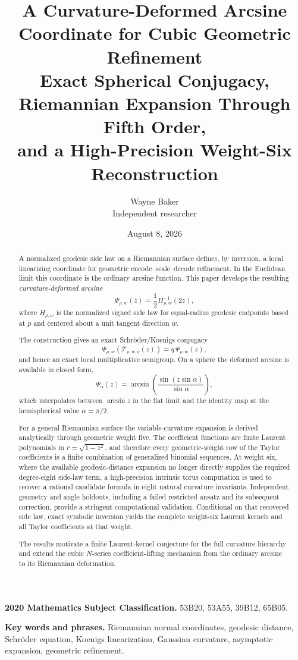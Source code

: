 \documentclass[11pt]{article}
\title{\textbf{A Curvature-Deformed Arcsine Coordinate for Cubic Geometric Refinement}\\[0.5em]
\large Exact Spherical Conjugacy, Riemannian Expansion Through Fifth Order,\\
and a High-Precision Weight-Six Reconstruction}
\author{Wayne Baker\\Independent researcher}
\date{August 8, 2026}
\theoremstyle{definition}
\theoremstyle{remark}
\newcommand{\cT}{\mathcal{T}}
\begin{document}
\maketitle

\begin{abstract}
A normalized geodesic side law on a Riemannian surface defines, by inversion, a
local linearizing coordinate for geometric encode--scale--decode refinement.
In the Euclidean limit this coordinate is the ordinary arcsine function.
This paper develops the resulting \emph{curvature-deformed arcsine}
\[
\Psi_{\rho,w}(z)=\frac12 H_{\rho,w}^{-1}(2z),
\]
where \(H_{\rho,w}\) is the normalized signed side law for equal-radius geodesic
endpoints based at \(p\) and centered about a unit tangent direction \(w\).

The construction gives an exact Schr\"oder/Koenigs conjugacy
\[
\Psi_{\rho,w}\!\left(\cT_{\rho,w,q}(z)\right)
=q\,\Psi_{\rho,w}(z),
\]
and hence an exact local multiplicative semigroup.  On a sphere the deformed
arcsine is available in closed form,
\[
\Psi_\alpha(z)
=
\arcsin\!\left(
\frac{\sin(z\sin\alpha)}{\sin\alpha}
\right),
\]
which interpolates between \(\arcsin z\) in the flat limit and the identity
map at the hemispherical value \(\alpha=\pi/2\).

For a general Riemannian surface the variable-curvature expansion is derived
analytically through geometric weight five.  The coefficient functions are
finite Laurent polynomials in \(r=\sqrt{1-z^2}\), and therefore every
geometric-weight row of the Taylor coefficients is a finite combination of
generalized binomial sequences.  At weight six, where the available
geodesic-distance expansion no longer directly supplies the required
degree-eight side-law term, a high-precision intrinsic torus computation is
used to recover a rational candidate formula in eight natural curvature
invariants.  Independent geometry and angle holdouts, including a failed
restricted ansatz and its subsequent correction, provide a stringent
computational validation.  Conditional on that recovered side law, exact
symbolic inversion yields the complete weight-six Laurent kernels and
all Taylor coefficients at that weight.

The results motivate a finite Laurent-kernel conjecture for the full
curvature hierarchy and extend the cubic \(N\)-series coefficient-lifting
mechanism from the ordinary arcsine to its Riemannian deformation.
\end{abstract}

\noindent\textbf{2020 Mathematics Subject Classification.} 53B20, 53A55, 39B12, 65B05.\par
\noindent\textbf{Key words and phrases.} Riemannian normal coordinates, geodesic distance, Schr\"oder equation, Koenigs linearization, Gaussian curvature, asymptotic expansion, geometric refinement.
\end{document}
